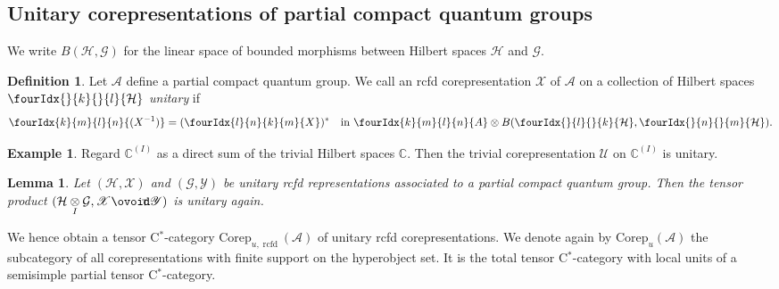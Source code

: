 \documentclass[10pt]{article}
\DeclareMathOperator{\rcf}{\mathrm{rcfd}}
\newcommand{\Corep}{\mathrm{Corep}}
\newcommand{\Circt}{{\mathop{\ooalign{$\ovoid$\cr\hidewidth\raise-.05ex\hbox{$\scriptstyle\mathsf T\mkern3.5mu$}\cr}}}} %
\newcommand{\C}{\mathbb{C}}
\newcommand{\Hsp}{\mathcal{H}}
\newcommand{\itimes}{\underset{I}{\otimes}}
\newcommand{\Gr}[5]{\fourIdx{#2}{#4}{#3}{#5}{#1}}%
\newcommand{\Gru}[3]{\Gr{#1}{}{}{#2}{#3}}
\newtheorem{Lem}[Theorem]{Lemma}
\theoremstyle{definition}
\newtheorem{Def}[Theorem]{Definition}
\newtheorem{Exa}[Theorem]{Example}
\numberwithin{equation}{section}
\begin{document}
\subsection{Unitary corepresentations of partial compact quantum groups}

 We write $B(\Hsp,\mathcal{G})$ for the linear space of
bounded morphisms between Hilbert spaces $\Hsp$ and $\mathcal{G}$. 

\begin{Def} Let $\mathscr{A}$ define a partial compact quantum
  group. We call an rcfd corepresentation $\mathscr{X}$ of $\mathscr{A}$ on a collection of Hilbert spaces $\Gru{\Hsp}{k}{l}$ 
   \emph{unitary}
  if \[\Gr{(X^{-1})}{k}{l}{m}{n}=(\Gr{X}{l}{k}{n}{m})^{*}\quad
  \textrm{in }\Gr{A}{k}{l}{m}{n}\otimes
  B(\Gru{\Hsp}{l}{k},\Gru{\Hsp}{n}{m}).\]
\end{Def} 


\begin{Exa}\label{example:rep-trivial-unitary}
  Regard $\C^{(I)}$ as a direct sum of the trivial Hilbert spaces $\C$. Then the
  trivial corepresentation $\mathscr{U}$ on $\C^{(I)}$ is unitary.
\end{Exa}

\begin{Lem}\label{lemma:rep-unitary-tensor}
  Let $(\Hsp,\mathscr{X})$ and $(\mathcal{G},\mathscr{Y})$ be unitary
  rcfd representations associated to a partial compact quantum group. Then the
  tensor product $(\Hsp \itimes \mathcal{G},\mathscr{X} \Circt
  \mathscr{Y})$ is unitary again.
\end{Lem}

We hence obtain a tensor C$^*$-category $\Corep_{u,\rcf}(\mathscr{A})$ of unitary rcfd corepresentations. We denote again by $\Corep_u(\mathscr{A})$ the subcategory of all corepresentations with finite support on the hyperobject set. It is the total tensor C$^*$-category with local units of a semisimple partial tensor C$^*$-category.
\end{document}
